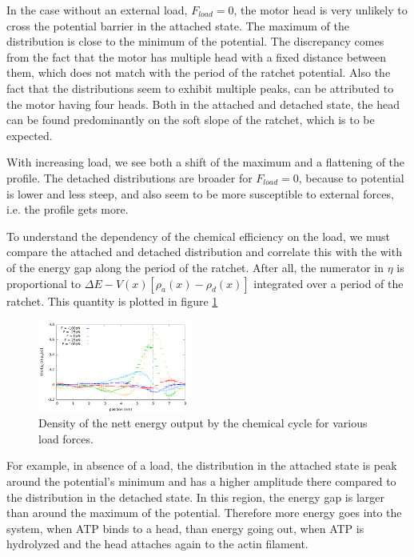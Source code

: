 \documentclass[aps,pre,twocolumn,showpacs,showkeys,a4paper]{revtex4}
\begin{document}
In the case without an external load, $F_{load}=0$, the motor head is very unlikely to cross the potential barrier in the attached state. 
The maximum of the distribution is close to the minimum of the potential. 
The discrepancy comes from the fact that the motor has multiple head with a fixed distance between them, which does not match with the period of the ratchet potential. 
Also the fact that the distributions seem to exhibit multiple peaks, can be attributed to the motor having four heads. 
Both in the attached and detached state, the head can be found predominantly on the soft slope of the ratchet, which is to be expected.


With increasing load, we see both a shift of the maximum and a flattening of the profile. 
The detached distributions are broader for $F_{load}=0$, because to potential is lower and less steep, and also seem to be more susceptible to external forces, i.e. the profile gets more. 


To understand the dependency of the chemical efficiency on the load, we must compare the attached and detached distribution and correlate this with the with of the energy gap along the period of the ratchet. 
After all, the numerator in $\eta$ is proportional to $\Delta E - V(x) \left[ \rho_a(x) - \rho_d(x) \right]$ integrated over a period of the ratchet. 
This quantity is plotted in figure \ref{Fig: chem_energy_distr}
\begin{figure}[b]
\centering
\includegraphics[width=0.45\textwidth,height=!]{chem_energy_distr_all_F}
\caption{Density of the nett energy output by the chemical cycle for various load forces.}
\label{Fig: chem_energy_distr}
\end{figure}


For example, in absence of a load, the distribution in the attached state is peak around the potential's minimum and has a higher amplitude there compared to the distribution in the detached state. 
In this region, the energy gap is larger than around the maximum of the potential. 
Therefore more energy goes into the system, when ATP binds to a head, than energy going out, when ATP is hydrolyzed and the head attaches again to the actin filament. 
\end{document}
